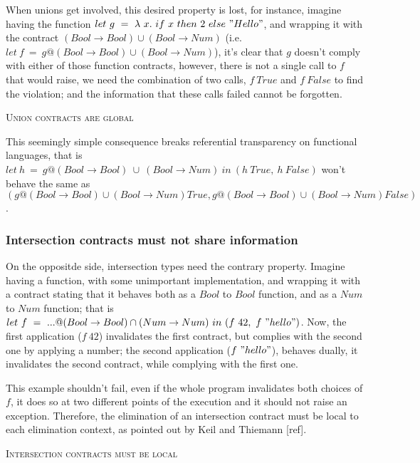 When unions get involved, this desired property is lost,
for instance, imagine having the function $let~g~=~\lambda~x.~if~x~then~2~else~"Hello"$,
and wrapping it with the contract $(Bool \rightarrow Bool) \cup (Bool \rightarrow Num)$
(i.e. $let~f~=~g@(Bool \rightarrow Bool) \cup (Bool \rightarrow Num)$),
it's clear that $g$ doesn't comply with either of those function contracts, however, there
is not a single call to $f$ that would raise, we need the combination of two calls,
$f~True$ and $f~False$ to find the violation; and the information that these calls failed
cannot be forgotten.

\textsc{Union contracts are global}


This seemingly simple consequence breaks referential transparency on
functional languages, that is
$let~h~=~g@(Bool \rightarrow Bool)~\cup~(Bool \rightarrow Num)~in~(h~True,~h~False)$
won't behave the same as 
$(g@(Bool \rightarrow Bool) \cup (Bool \rightarrow Num) True, g@(Bool \rightarrow Bool) \cup (Bool \rightarrow Num) False)$.

\subsubsection*{Intersection contracts must not share information}

On the oppositde side, intersection types need the contrary property.
Imagine having a function, with some unimportant implementation,
and wrapping it
with a contract stating that it behaves both as a $Bool$ to $Bool$ function,
and as a $Num$ to $Num$ function; that is 
$let~f~=~...@(Bool \rightarrow Bool) \cap (Num \rightarrow Num)~in~(f~42,~f~"hello")$.
Now, the first application ($f~42$) invalidates the first contract, but complies with the second
one by applying a number; the second application ($f~"hello"$), behaves dually,
it invalidates the second contract,
while complying with the first one.

This example shouldn't fail, even if the whole program invalidates both choices of $f$, it does
so at two different points of the execution and it should not raise an exception.
Therefore, the elimination of an intersection contract must be local to each elimination
context, as pointed out by Keil and Thiemann [ref].

\textsc{Intersection contracts must be local}\\


